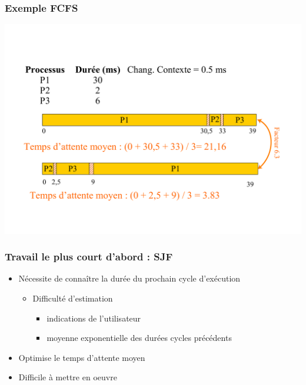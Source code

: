 \begin{frame}
 \frametitle{Exemple FCFS}
 \includegraphics[width=\textwidth]{../illustration/fcfs_exemple.pdf}
\end{frame}


\begin{frame}
 \frametitle{Travail le plus court d’abord : SJF}
 \begin{itemize}
 \item Nécessite de connaître la durée du prochain cycle d’exécution
\begin{itemize}
 \item Difficulté d’estimation
 \begin{itemize}
 \item indications de l’utilisateur
 \item moyenne exponentielle des durées cycles précédents 
 \end{itemize}
 \end{itemize}

 \item Optimise le temps d’attente moyen
\item Difficile à mettre en oeuvre
 \end{itemize}
\end{frame}



